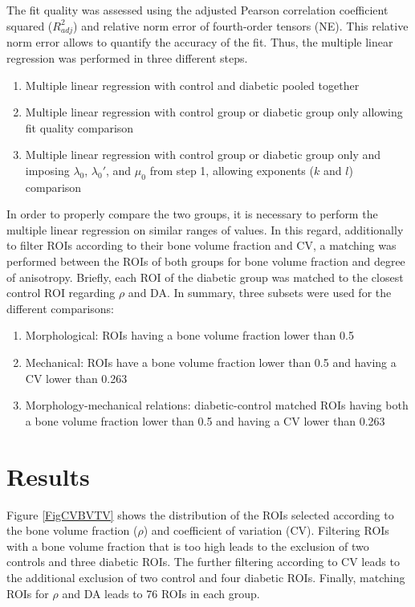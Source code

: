 \documentclass[a4paper,fleqn]{DC_ArtStyle}
\begin{document}
	The fit quality was assessed using the adjusted Pearson correlation coefficient squared ($R_{adj}^{2}$) and relative norm error of fourth-order tensors (NE).
	This relative norm error allows to quantify the accuracy of the fit.
	Thus, the multiple linear regression was performed in three different steps.
	\begin{enumerate}
		\item Multiple linear regression with control and diabetic pooled together
		\item Multiple linear regression with control group or diabetic group only allowing fit quality comparison
		\item Multiple linear regression with control group or diabetic group only and imposing $\lambda_0$, $\lambda_0'$, and $\mu_0$ from step 1, allowing exponents ($k$ and $l$) comparison
	\end{enumerate}
	In order to properly compare the two groups, it is necessary to perform the multiple linear regression on similar ranges of values.
	In this regard, additionally to filter ROIs according to their bone volume fraction and CV, a matching was performed between the ROIs of both groups for bone volume fraction and degree of anisotropy.
	Briefly, each ROI of the diabetic group was matched to the closest control ROI regarding $\rho$ and DA.
	In summary, three subsets were used for the different comparisons:
	\begin{enumerate}
		\item Morphological: ROIs having a bone volume fraction lower than 0.5
		\item Mechanical: ROIs have a bone volume fraction lower than 0.5 and having a CV lower than 0.263
		\item Morphology-mechanical relations: diabetic-control mat\-ched ROIs having both a bone volume fraction lower than 0.5 and having a CV lower than 0.263
	\end{enumerate}


	\section{Results}
	Figure \ref{FigCVBVTV} shows the distribution of the ROIs selected according to the bone volume fraction ($\rho$) and coefficient of variation (CV).
	Filtering ROIs with a bone volume fraction that is too high leads to the exclusion of two controls and three diabetic ROIs.
	The further filtering according to CV leads to the additional exclusion of two control and four diabetic ROIs.
	Finally, matching ROIs for $\rho$ and DA leads to 76 ROIs in each group.
   
\end{document}
